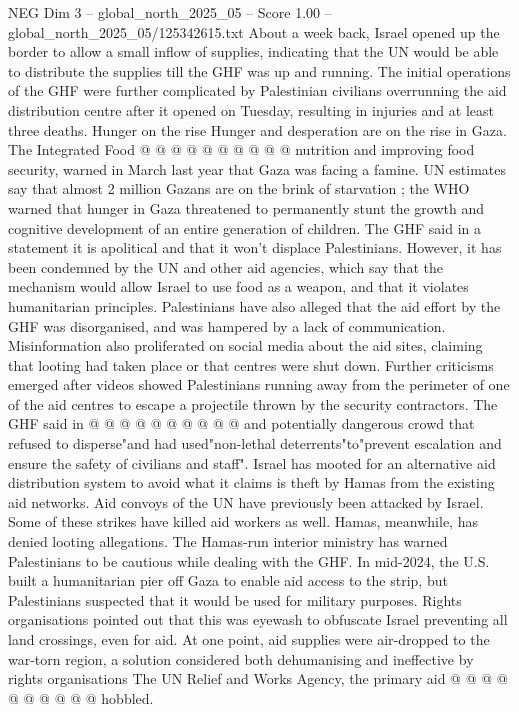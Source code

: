 \begin{textsample}{NEG Dim 3 – global\_north\_2025\_05 – Score 1.00 – global\_north\_2025\_05/125342615.txt}
About a week back, Israel opened up the border to allow a small inflow of supplies, indicating that the UN would be able to distribute the supplies till the GHF was up and running.
The initial operations of the GHF were further complicated by Palestinian civilians overrunning the aid distribution centre after it opened on Tuesday, resulting in injuries and at least three deaths.
Hunger on the rise Hunger and desperation are on the rise in Gaza.
The Integrated Food @ @ @ @ @ @ @ @ @ @ nutrition and improving food security, warned in March last year that Gaza was facing a famine.
UN estimates say that almost 2 million Gazans are on the brink of starvation ; the WHO warned that hunger in Gaza threatened to permanently stunt the growth and cognitive development of an entire generation of children.
The GHF said in a statement it is apolitical and that it won't displace Palestinians.
However, it has been condemned by the UN and other aid agencies, which say that the mechanism would allow Israel to use food as a weapon, and that it violates humanitarian principles.
Palestinians have also alleged that the aid effort by the GHF was disorganised, and was hampered by a lack of communication.
Misinformation also proliferated on social media about the aid sites, claiming that looting had taken place or that centres were shut down.
Further criticisms emerged after videos showed Palestinians running away from the perimeter of one of the aid centres to escape a projectile thrown by the security contractors.
The GHF said in @ @ @ @ @ @ @ @ @ @ and potentially dangerous crowd that refused to disperse"and had used"non-lethal deterrents"to"prevent escalation and ensure the safety of civilians and staff".
Israel has mooted for an alternative aid distribution system to avoid what it claims is theft by Hamas from the existing aid networks.
Aid convoys of the UN have previously been attacked by Israel.
Some of these strikes have killed aid workers as well.
Hamas, meanwhile, has denied looting allegations.
The Hamas-run interior ministry has warned Palestinians to be cautious while dealing with the GHF.
In mid-2024, the U.S. built a humanitarian pier off Gaza to enable aid access to the strip, but Palestinians suspected that it would be used for military purposes.
Rights organisations pointed out that this was eyewash to obfuscate Israel preventing all land crossings, even for aid.
At one point, aid supplies were air-dropped to the war-torn region, a solution considered both dehumanising and ineffective by rights organisations The UN Relief and Works Agency, the primary aid @ @ @ @ @ @ @ @ @ @ hobbled.

\end{textsample}
